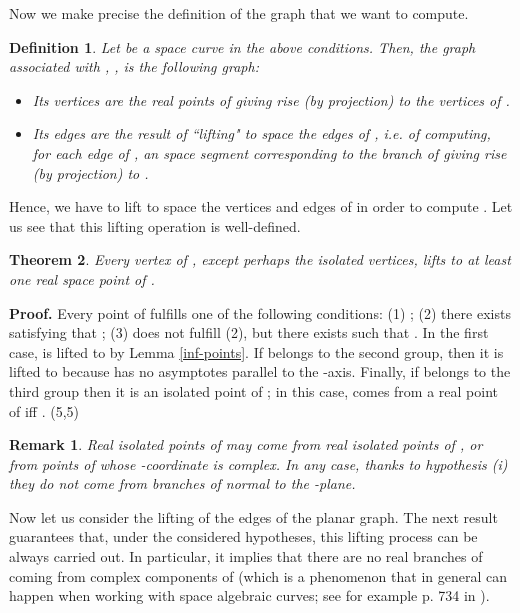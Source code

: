 \documentclass{elsart}
\def\qed{\hfill  \framebox(5,5){}}
\newtheorem{theorem}{{\bf Theorem}}
\newtheorem{remark}{{\bf Remark}}
\newtheorem{definition}[theorem]{{\bf Definition}}
\begin{document}
Now we make precise the definition of the graph 
that we want to compute.

\begin{definition} \label{graph-assoc-3d}
Let  be a space curve in the above conditions. Then, the {\sf graph associated with }, , is the following graph:
\begin{itemize}
\item [(i)] Its vertices are the real points of  giving rise (by projection) to the vertices of .
    \item [(ii)] Its edges are the result of ``lifting" to space the edges of , i.e. of computing, for each edge  of , an space segment  corresponding to the branch of  giving rise (by projection) to .
        \end{itemize}
        \end{definition}

        Hence, we have to lift to space the vertices and edges of  in order to compute . Let us see that this lifting operation is well-defined.


\begin{theorem} \label{th-vert-lift}
Every vertex of , except perhaps the isolated vertices, lifts to at least one real space point of .
\end{theorem}

{\bf Proof.} Every point of  fulfills one of the following conditions: (1)
; (2) there exists  satisfying that
; (3)  does not fulfill (2), but there exists
 such that . In the first case,
is lifted to  by Lemma \ref{inf-points}.  If 
belongs to the second group, then it is lifted to 
because  has no asymptotes parallel to the -axis.
Finally, if  belongs to the third group then it is an isolated
point of ; in this case,  comes from a
real point of  iff . \qed

\begin{remark} \label{rem-isol}
Real isolated points of  may come from real isolated points of , or from points of  whose -coordinate is complex. In any case, thanks to hypothesis (i) they do not come from branches of  normal to the -plane.
\end{remark}


Now let us consider the lifting of the edges of the planar graph.
The next result guarantees that, under the considered hypotheses,
this lifting process can be always carried out. In particular, it
implies that there are no real branches of  coming from complex components of  (which is a
phenomenon that in general can happen when working with space
algebraic curves; see for example p. 734 in \cite{JG-Sendra}).
\end{document}
